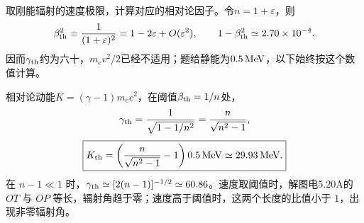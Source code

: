 \documentclass[UTF8,fontset=fandol,a4paper,11pt]{ctexart}
\begin{document}
取刚能辐射的速度极限，计算对应的相对论因子。令$n=1+\varepsilon$，则
\[
\beta_{\rm th}^2=\frac1{(1+\varepsilon)^2}
=1-2\varepsilon+O(\varepsilon^2),\qquad
1-\beta_{\rm th}^2\simeq2.70\times10^{-4}.
\]
因而$\gamma_{\rm th}$约为六十，$m_ev^2/2$已经不适用；题给静能为$0.5\,{\rm MeV}$，以下始终按这个数值计算。

相对论动能$K=(\gamma-1)m_ec^2$，在阈值$\beta_{\rm th}=1/n$处，
\[
 \gamma_{\rm th}=\frac1{\sqrt{1-1/n^2}}
 =\frac n{\sqrt{n^2-1}},
\]
\[
 \boxed{K_{\rm th}=
 \left(\frac n{\sqrt{n^2-1}}-1\right)0.5\,{\rm MeV}
 \simeq29.93\,{\rm MeV}.}
\]
在 $n-1\ll1$ 时，$\gamma_{\rm th}\simeq[2(n-1)]^{-1/2}\simeq60.86$。速度取阈值时，解图电5.20A的 $OT$ 与 $OP$ 等长，辐射角趋于零；速度高于阈值时，这两个长度的比值小于 $1$，出现非零辐射角。

\begin{center}\begin{minipage}{.97\linewidth}\centering
{}
\end{minipage}
\end{center}
\end{document}

